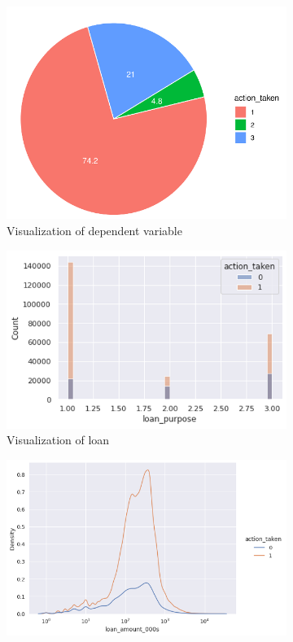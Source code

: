 \documentclass{jpp}
\begin{document}
\begin{figure}
\begin{subfigure}{.5\textwidth}
  \centering
  \includegraphics[width=.9\linewidth]{EDA1.png}  
  \caption{Visualization of dependent variable}\label{EDA1}
\end{subfigure}
\begin{subfigure}{.5\textwidth}
  \centering
  \includegraphics[width=.9\linewidth]{EDA2.png}  
  \caption{Visualization of loan}\label{EDA2}
\end{subfigure}
\begin{subfigure}{.5\textwidth}
  \centering
  \includegraphics[width=.9\linewidth]{EDA3.png}  

\end{subfigure}
\end{figure}
\end{document}
